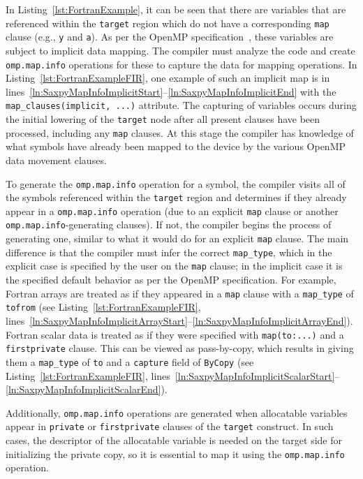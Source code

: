 \documentclass[acmtog,natbib=false]{acmart}
\newcommand{\code}[1]{\texttt{#1}\xspace}
\begin{document}
In Listing~\ref{lst:FortranExample}, it can be seen that there are variables that are referenced within the \code{target} region which do not have a corresponding \code{map} clause (e.g., \code{y} and \code{a}).
As per the OpenMP specification~\cite{OARB24}, these variables are subject to implicit data mapping.
The compiler must analyze the code and create \code{omp.map.info} operations for these to capture the data for mapping operations. 
In Listing~\ref{lst:FortranExampleFIR}, one example of such an implicit map is in lines~\ref{ln:SaxpyMapInfoImplicitStart}--\ref{ln:SaxpyMapInfoImplicitEnd} with the \code{map\_clauses(implicit, ...)} attribute.
The capturing of variables occurs during the initial lowering of the \code{target} node after all present clauses have been processed, including any \code{map} clauses. 
At this stage the compiler has knowledge of what symbols have already been mapped to the device by the various OpenMP data movement clauses.

To generate the \code{omp.map.info} operation for a symbol, the compiler visits all of the symbols referenced within the \code{target} region and determines if they already appear in a \code{omp.map.info} operation (due to an explicit \code{map} clause or another \code{omp.map.info}-generating clauses). 
If not, the compiler begins the process of generating one, similar to what it would do for an explicit \code{map} clause.
The main difference is that the compiler must infer the correct \code{map\_type}, which in the explicit case is specified by the user on the \code{map} clause; in the implicit case it is the specified default behavior as per the OpenMP specification.
For example, Fortran arrays are treated as if they appeared in a \code{map} clause with a \code{map\_type} of \code{tofrom} (see Listing~\ref{lst:FortranExampleFIR}, lines~\ref{ln:SaxpyMapInfoImplicitArrayStart}--\ref{ln:SaxpyMapInfoImplicitArrayEnd}).
Fortran scalar data is treated as if they were specified with \code{map(to:...)} and a \code{firstprivate} clause.
This can be viewed as pass-by-copy, which results in giving them a \code{map\_type} of \code{to} and a \code{capture} field of \code{ByCopy} (see Listing~\ref{lst:FortranExampleFIR}, lines~\ref{ln:SaxpyMapInfoImplicitScalarStart}--\ref{ln:SaxpyMapInfoImplicitScalarEnd}). 

Additionally, \code{omp.map.info} operations are generated when allocatable variables appear in \code{private} or \code{firstprivate} clauses of the \code{target} construct.
In such cases, the descriptor of the allocatable variable is needed on the target side for initializing the private copy, so it is essential to map it using the \code{omp.map.info} operation.
\end{document}
